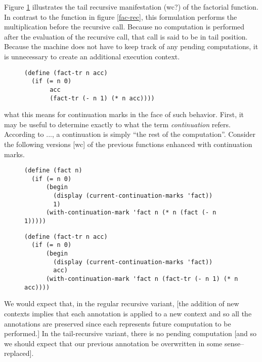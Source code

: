 \documentclass[ms]{byuprop}
\begin{document}
Figure \ref{fac-tail-rec} illustrates the tail recursive manifestation (wc?) of the factorial function. In contrast to the function in figure \ref{fac-rec}, this formulation performs the multiplication before the recursive call. Because no computation is performed after the evaluation of the recursive call, that call is said to be in tail position. Because the machine does not have to keep track of any pending computations, it is unnecessary to create an additional execution context.

\begin{figure}
\label{fac-tail-rec}
\begin{verbatim}
(define (fact-tr n acc)
  (if (= n 0)
       acc
       (fact-tr (- n 1) (* n acc))))
\end{verbatim}
\end{figure}

what this means for continuation marks in the face of such behavior. 
First, it may be useful to determine exactly to what the term 
\emph{continuation} refers. According to ..., a continuation is simply 
``the rest of the computation''. Consider the following versions [wc] of 
the previous functions enhanced with continuation marks.

\begin{figure}
\label{fac-rec-cm}
\begin{verbatim}
(define (fact n)
  (if (= n 0)
      (begin
        (display (current-continuation-marks 'fact))
        1)
      (with-continuation-mark 'fact n (* n (fact (- n 1)))))
\end{verbatim}
\end{figure}

\begin{figure}
\label{fac-tail-rec-cm}
\begin{verbatim}
(define (fact-tr n acc)
  (if (= n 0)
      (begin
        (display (current-continuation-marks 'fact))
        acc)
      (with-continuation-mark 'fact n (fact-tr (- n 1) (* n acc))))
\end{verbatim}
\end{figure}

We would expect that, in the regular recursive variant, [the addition of new contexts implies that each annotation is applied to a new context and so all the annotations are preserved since each represents future computation to be performed.] In the tail-recursive variant, there is no pending computation [and so we should expect that our previous annotation be overwritten in some sense--replaced].
\end{document}
